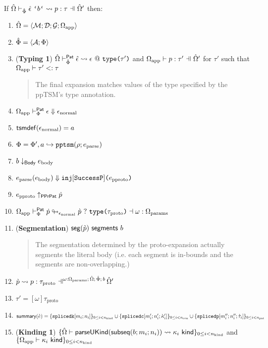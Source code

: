 \begingroup
\def\thetheorem{\ref{thm:pptsm-abstract-reasoning-principles}}
\begin{theorem}
If $\patExpandsP{\uOmega'}{\uPhi}{\utsmap{\uepsilon}{b}}{p}{\tau}$ then:
\begin{enumerate}
  \item ${\hat\Omega}=\langle \mathcal{M}; \mathcal{D}; \mathcal{G}; \Omega_\text{app} \rangle$
  \item $\hat\Phi=\langle \mathcal{A}; \Phi \rangle$
  \item (\textbf{Typing 1}) ${\hat\Omega} \vdash_{\hat\Phi}^{\mathsf{Pat}} {\hat\epsilon} \leadsto \epsilon~@~\texttt{type}\texttt{(}\tau'\texttt{)}$ and $\patTypePC{\Omega_\text{app}}{\uOmega'}{p}{\tau'}$ for $\tau'$ such that $\Omega_\text{app} \vdash \tau' <: \tau$
  	\begin{quote}
  		The final expansion matches values of the type specified by the ppTSM's type annotation.
  	\end{quote}
  \item $\Omega_\text{app} \vdash_{\Phi}^\mathsf{Pat} \epsilon \Downarrow \epsilon_\text{normal}$
  \item $\mathsf{tsmdef}(\epsilon_\text{normal})=a$
  \item $\Phi = \Phi', a \hookrightarrow \texttt{pptsm}(\rho; e_\text{parse})$
  \item $b \downarrow_\mathsf{Body} e_\text{body}$
  \item $e_\text{parse}(e_\text{body}) \Downarrow \texttt{inj}[\mathtt{SuccessP}]\texttt{(}e_\text{pproto}\texttt{)}$
  \item $e_\text{pproto} \uparrow_\mathsf{PPrPat} \dot{p}$
  \item $\Omega_\text{app} \vdash_{\Phi}^\mathsf{Pat} \dot{p} \looparrowright_{\epsilon_\text{normal}} \grave{p} ~?~ \texttt{type}\texttt{(}\tau_\text{proto}\texttt{)} \dashv \omega : \Omega_\text{params}$
  \item (\textbf{Segmentation}) $\mathsf{seg}(\grave{p})~\mathsf{segments}~b$
  	\begin{quote}
  		The segmentation determined by the proto-expansion actually segments the literal body (i.e. each segment is in-bounds and the segments are non-overlapping.)
  	\end{quote}
    \item $\cvalidPP{\uOmega'}{\psceneP{\omega : \Omega_\text{params}}{\uOmega}{\uPhi}{b}}{\cpv}{p}{\tau_\text{proto}}$
      \item $\tau'=[\omega]\tau_\text{proto}$
	\item $
	\mathsf{summary}(\grave{e}) = \{\texttt{splicedk}[m_i; n_i]\}_{0 \leq i < n_\text{kind}} \cup \{\texttt{splicedc}[m'_i; n'_i; {\grave\kappa}'_i]\}_{0 \leq i < n_\text{con}} \cup\\
				     \{\texttt{splicedp}[m''_i; n''_i; \grave{\tau}_i]\}_{0 \leq i < n_\text{pat}}
	$
	\item (\textbf{Kinding 1}) $\{{\hat\Omega} \vdash \mathsf{parseUKind}(\mathsf{subseq}(b; m_i; n_i)) \leadsto \kappa_i~\mathsf{kind}\}_{0 \leq i < n_\text{kind}}$ and $\{\Omega_\text{app} \vdash \kappa_i~\mathsf{kind}\}_{0 \leq i < n_\text{kind}}$

\end{enumerate}
\end{theorem}
